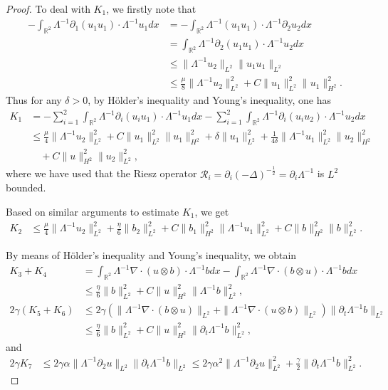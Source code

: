 \documentclass[reqno,11pt]{amsart}
\def\R{\mathbb R}
\numberwithin{Thm}{section}
\begin{document}
\begin{proof}
To deal with $K_1$, we firstly note that
\begin{align*}
-\int_{\R^2}\Lambda^{-1}\partial_1(u_1 u_1)\cdot\Lambda^{-1}u_1dx
&=-\int_{\R^2}\Lambda^{-1}(u_1 u_1)\cdot\Lambda^{-1}\partial_2u_2dx\\
&=\int_{\R^2}\Lambda^{-1}\partial_2(u_1 u_1)\cdot\Lambda^{-1}u_2dx\\
&\leq
\|\Lambda^{-1}u_2\|_{L^{2}}\|u_1u_1\|_{L^{2}}\\
&\leq\frac{\mu}{8}\|\Lambda^{-1}u_2\|_{L^{2}}^2+C\|u_1\|_{L^{2}}^2\|u_1\|_{H^{2}}^2.
\end{align*}
Thus for any $\delta>0$, by H\"{o}lder's inequality and Young's inequality, one has
\begin{align*}
K_{1}&=-\sum_{i=1}^2\int_{\R^2}\Lambda^{-1}\partial_i(u_i u_1)\cdot\Lambda^{-1}u_1dx-\sum_{i=1}^2\int_{\R^2}\Lambda^{-1}\partial_i(u_i u_2)\cdot\Lambda^{-1}u_2dx\\
&\leq\frac{\mu}{4}\|\Lambda^{-1}u_2\|_{L^{2}}^2+C\|u_1\|_{L^{2}}^2\|u_1\|_{H^{2}}^2+\delta\|u_1\|_{L^{2}}^2+\frac{1}{4\delta}\|\Lambda^{-1}u_1\|_{L^{2}}^2\|u_2\|_{H^{2}}^2\\
&\quad+C\|u\|_{H^{2}}^2\|u_2\|_{L^{2}}^2,
\end{align*}
where we have used that the Riesz operator $\mathcal{R}_i=\partial_i(-\Delta)^{-\frac 12}=\partial_i\Lambda^{-1}$ is $L^2$ bounded.

Based on similar arguments to estimate $K_1$, we get
\begin{align*}
K_{2}&\leq\frac{\mu}{4}\|\Lambda^{-1}u_2\|_{L^{2}}^2+\frac{\eta}{6}\|b_2\|_{L^{2}}^2+C\|b_1\|_{H^2}^2\|\Lambda^{-1}u_1\|_{L^{2}}^2+C\|b\|_{H^{2}}^2\|b\|_{L^{2}}^2.
\end{align*}

By means of H\"{o}lder's inequality and Young's inequality, we obtain
\begin{align*}
K_{3}+K_{4}&=\int_{\R^2}\Lambda^{-1}\nabla\cdot(u\otimes b)\cdot\Lambda^{-1}bdx-\int_{\R^2}\Lambda^{-1}\nabla\cdot(b\otimes u)\cdot\Lambda^{-1}bdx\nonumber\\
&\leq \frac{\eta}{6}\|b\|_{L^{2}}^2+C\|u\|_{H^{2}}^2\|\Lambda^{-1}b\|_{L^{2}}^2,\nonumber\\
2\gamma(K_{5}+K_6)
&\leq
2\gamma(\|\Lambda^{-1}\nabla\cdot(b\otimes u)\|_{L^{2}}+\|\Lambda^{-1}\nabla\cdot(u\otimes b)\|_{L^{2}})\|\partial_t\Lambda^{-1}b\|_{L^{2}}\nonumber\\
&\leq
\frac{\eta}{6}\|b\|_{L^{2}}^2+C\|u\|_{H^{2}}^2\|\partial_t\Lambda^{-1}b\|_{L^{2}}^2,
\end{align*}
and
\begin{align*}
2\gamma K_{7}
&\leq
2\gamma\alpha\|\Lambda^{-1}\partial_2u\|_{L^{2}}\|\partial_t\Lambda^{-1}b\|_{L^{2}}\leq
2\gamma\alpha^2\|\Lambda^{-1}\partial_2u\|_{L^{2}}^2+\frac{\gamma}{2}\|\partial_t\Lambda^{-1}b\|_{L^{2}}^2.
\end{align*}


\end{proof}
\end{document}
